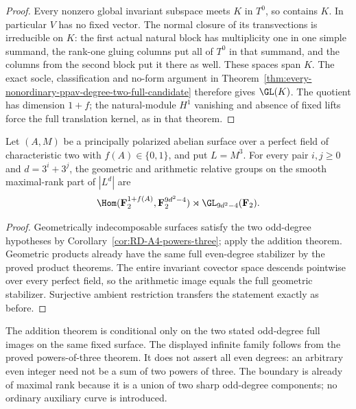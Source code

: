 \begin{proof}
Every nonzero global invariant subspace meets $K$ in $T^0$,
so contains $K$. In particular $V$ has no fixed vector. The
normal closure of its transvections is irreducible on $K$:
the first actual natural block has multiplicity one in one
simple summand, the rank-one gluing columns put all of $T^0$
in that summand, and the columns from the second block put
it there as well. These spaces span $K$. The exact socle,
classification and no-form argument in
Theorem~\ref{thm:every-nonordinary-ppav-degree-two-full-candidate}
therefore gives $\GL(K)$. The quotient has dimension $1+f$;
the natural-module $H^1$ vanishing and absence of fixed lifts
force the full translation kernel, as in that theorem.
\end{proof}

\begin{corollary}
\label{cor:nonordinary-even-three-power-sums-candidate}
Let $(A,M)$ be a principally polarized abelian surface over a
perfect field of characteristic two with $f(A)\in\{0,1\}$,
and put $L=M^3$. For every pair $i,j\ge0$ and
$d=3^i+3^j$, the geometric and arithmetic relative groups on
the smooth maximal-rank part of $|L^d|$ are
\[
 \Hom(\mathbf F_2^{1+f(A)},\mathbf F_2^{9d^2-4})
                               \rtimes\GL_{9d^2-4}(\mathbf F_2).
\]
\end{corollary}
\begin{proof}
Geometrically indecomposable surfaces satisfy the two odd-degree
hypotheses by Corollary~\ref{cor:RD-A4-powers-three}; apply the
addition theorem. Geometric products already have the same
full even-degree stabilizer by the proved product theorems.
The entire invariant covector space descends pointwise over
every perfect field, so the arithmetic image equals the full
geometric stabilizer. Surjective ambient restriction transfers
the statement exactly as before.
\end{proof}

\begin{remark}[Scope]
\label{rem:nonordinary-even-addition-scope-candidate}
The addition theorem is conditional only on the two stated
odd-degree full images on the same fixed surface. The displayed
infinite family follows from the proved powers-of-three theorem.
It does not assert all even degrees: an arbitrary even integer
need not be a sum of two powers of three. The boundary is already
of maximal rank because it is a union of two sharp odd-degree
components; no ordinary auxiliary curve is introduced.
\end{remark}
